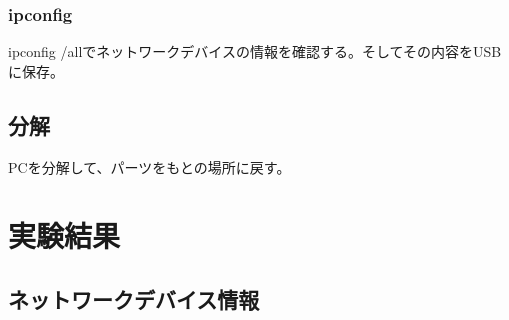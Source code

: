\documentclass[10pt]{article}
\begin{document}
\subsubsection{ipconfig}
	ipconfig /allでネットワークデバイスの情報を確認する。そしてその内容をUSBに保存。

\subsection{分解}
\hspace{1cm}PCを分解して、パーツをもとの場所に戻す。

	
\pagebreak

\section{実験結果}
\subsection{ネットワークデバイス情報}
 \noindent\makebox[\linewidth]{\rule{\paperwidth}{0.4pt}}
 
\end{document}
